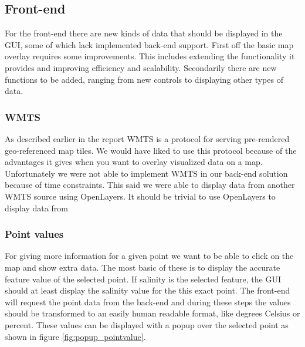 \documentclass[11pt,a4paper,titlepage,oneside]{report}
\begin{document}
\subsection{Front-end}
For the front-end there are new kinds of data that should be displayed in the \gls{GUI}, some of which lack implemented \gls{back-end} support. First off the basic map overlay requires some improvements. This includes extending the functionality it provides and improving efficiency and scalability. Secondarily there are new functions to be added, ranging from new controls to displaying other types of data.
\subsubsection{WMTS}
As described earlier in the report \gls{WMTS} is a protocol for serving pre-rendered geo-referenced map tiles. We would have liked to use this protocol because of the advantages it gives when you want to overlay visualized data on a map. Unfortunately we were not able to implement WMTS in our back-end solution because of time constraints. This said we were able to display data from another \gls{WMTS} source using OpenLayers. It should be trivial to use OpenLayers to display data from  


\subsubsection{Point values}
For giving more information for a given point we want to be able to click on the map and show extra data. The most basic of these is to display the accurate feature value of the selected point. If salinity is the selected feature, the \gls{GUI} should at least display the salinity value for the this exact point. The \gls{front-end} will request the point data from the \gls{back-end} and during these steps the values should be transformed to an easily human readable format, like degrees Celsius or percent.
These values can be displayed with a popup over the selected point as shown in figure \ref{fig:popup_pointvalue}.
\end{document}
